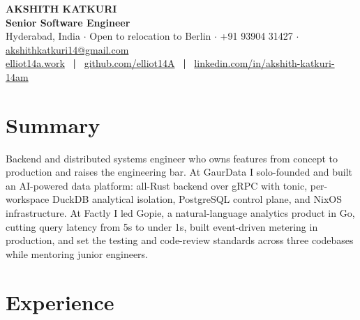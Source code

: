 \documentclass[10pt,a4paper]{article}
\begin{document}
\begin{center}
  {\fontsize{18pt}{20pt}\selectfont \textbf{\color{primary}AKSHITH KATKURI}}\\[3pt]
  {\fontsize{11pt}{13pt}\selectfont \textbf{\color{primary}Senior Software Engineer}}\\[3pt]
  {\small Hyderabad, India $\cdot$ Open to relocation to Berlin $\cdot$ +91 93904 31427 $\cdot$ \href{mailto:akshithkatkuri14@gmail.com}{akshithkatkuri14@gmail.com}}\\[2.5pt]
  {\small \href{https://elliot14a.work}{elliot14a.work} \ \textbf{|} \ \href{https://github.com/elliot14A}{github.com/elliot14A} \ \textbf{|} \ \href{https://linkedin.com/in/akshith-katkuri-14am}{linkedin.com/in/akshith-katkuri-14am}}
\end{center}
\vspace{-2pt}

\section*{Summary}
Backend and distributed systems engineer who owns features from concept to production and raises the engineering bar. At GaurData I solo-founded and built an AI-powered data platform: all-Rust backend over gRPC with tonic, per-workspace DuckDB analytical isolation, PostgreSQL control plane, and NixOS infrastructure. At Factly I led Gopie, a natural-language analytics product in Go, cutting query latency from 5s to under 1s, built event-driven metering in production, and set the testing and code-review standards across three codebases while mentoring junior engineers.

\section*{Experience}
\end{document}
